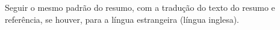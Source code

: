 
\begin{abstractutfpr}%
Seguir o mesmo padrão do resumo, com a tradução do texto do resumo e referência, se houver, para a língua estrangeira (língua inglesa).
\end{abstractutfpr}
